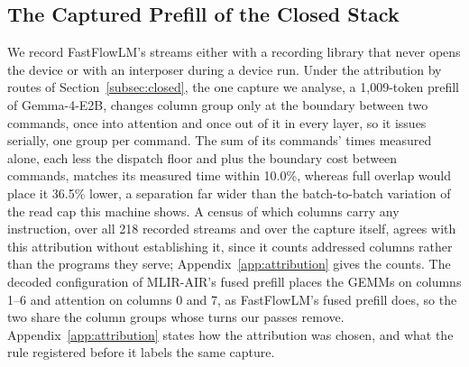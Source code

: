 \subsection{The Captured Prefill of the Closed Stack}
\label{app:capture}

We record FastFlowLM's streams either with a recording library that never opens the device or with an interposer during a device run.
Under the attribution by routes of Section~\ref{subsec:closed}, the one capture we analyse, a 1{,}009-token prefill of Gemma-4-E2B, changes column group only at the boundary between two commands, once into attention and once out of it in every layer, so it issues serially, one group per command.
The sum of its commands' times measured alone, each less the dispatch floor and plus the boundary cost between commands, matches its measured time within 10.0\%, whereas full overlap would place it 36.5\% lower, a separation far wider than the batch-to-batch variation of the read cap this machine shows.
A census of which columns carry any instruction, over all 218 recorded streams and over the capture itself, agrees with this attribution without establishing it, since it counts addressed columns rather than the programs they serve; Appendix~\ref{app:attribution} gives the counts.
The decoded configuration of MLIR-AIR's fused prefill places the GEMMs on columns 1--6 and attention on columns 0 and 7, as FastFlowLM's fused prefill does, so the two share the column groups whose turns our passes remove.
Appendix~\ref{app:attribution} states how the attribution was chosen, and what the rule registered before it labels the same capture.
